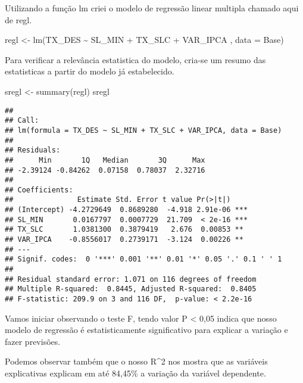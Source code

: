 \documentclass[
]{article}
\newenvironment{Shaded}{\begin{snugshade}}{\end{snugshade}}
\newcommand{\AttributeTok}[1]{\textcolor[rgb]{0.77,0.63,0.00}{#1}}
\newcommand{\FunctionTok}[1]{\textcolor[rgb]{0.00,0.00,0.00}{#1}}
\newcommand{\NormalTok}[1]{#1}
\newcommand{\OtherTok}[1]{\textcolor[rgb]{0.56,0.35,0.01}{#1}}
\newcommand{\SpecialCharTok}[1]{\textcolor[rgb]{0.00,0.00,0.00}{#1}}
\begin{document}
Utilizando a função lm criei o modelo de regressão linear multipla
chamado aqui de regl.

\begin{Shaded}
\begin{Highlighting}[]
\NormalTok{regl }\OtherTok{\textless{}{-}} \FunctionTok{lm}\NormalTok{(TX\_DES }\SpecialCharTok{\textasciitilde{}}\NormalTok{ SL\_MIN }\SpecialCharTok{+}\NormalTok{ TX\_SLC }\SpecialCharTok{+}\NormalTok{ VAR\_IPCA ,   }\AttributeTok{data =}\NormalTok{ Base)                                                                                                                                  }
\end{Highlighting}
\end{Shaded}

Para verificar a relevância estatistica do modelo, cria-se um resumo das
estatisticas a partir do modelo já estabelecido.

\begin{Shaded}
\begin{Highlighting}[]
\NormalTok{sregl }\OtherTok{\textless{}{-}} \FunctionTok{summary}\NormalTok{(regl)}
\NormalTok{sregl                                                                                                                             }
\end{Highlighting}
\end{Shaded}

\begin{verbatim}
## 
## Call:
## lm(formula = TX_DES ~ SL_MIN + TX_SLC + VAR_IPCA, data = Base)
## 
## Residuals:
##      Min       1Q   Median       3Q      Max 
## -2.39124 -0.84262  0.07158  0.78037  2.32716 
## 
## Coefficients:
##               Estimate Std. Error t value Pr(>|t|)    
## (Intercept) -4.2729649  0.8689280  -4.918 2.91e-06 ***
## SL_MIN       0.0167797  0.0007729  21.709  < 2e-16 ***
## TX_SLC       1.0381300  0.3879419   2.676  0.00853 ** 
## VAR_IPCA    -0.8556017  0.2739171  -3.124  0.00226 ** 
## ---
## Signif. codes:  0 '***' 0.001 '**' 0.01 '*' 0.05 '.' 0.1 ' ' 1
## 
## Residual standard error: 1.071 on 116 degrees of freedom
## Multiple R-squared:  0.8445, Adjusted R-squared:  0.8405 
## F-statistic: 209.9 on 3 and 116 DF,  p-value: < 2.2e-16
\end{verbatim}

Vamos iniciar observando o teste F, tendo valor P \textless{} 0,05
indica que nosso modelo de regressão é estatisticamente significativo
para explicar a variação e fazer previsões.

Podemos observar também que o nosso R\^{}2 nos mostra que as variáveis
explicativas explicam em até 84,45\% a variação da variável dependente.
\end{document}
